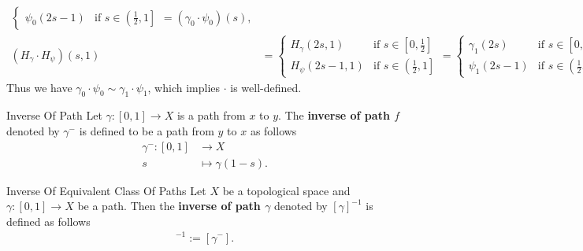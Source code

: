 \documentclass{report}
\begin{document}
\begin{prf}
\[\begin{aligned}
\begin{cases}
				                                                           \psi_0(2s-1) & \text{if }s\in\left(\left.\frac{1}{2},1\right]\right.
			                                                           \end{cases}=\left(\gamma_0\cdot \psi_0\right)(s), \\
			\left(H_{\gamma}\cdot H_{\psi}\right)(s, 1) & =\begin{cases}
				                                               H_{\gamma}(2s, 1) & \text{if }s\in\left[0,\frac{1}{2}\right]              \\
				                                               H_{\psi}(2s-1, 1) & \text{if }s\in\left(\left.\frac{1}{2},1\right]\right.
			                                               \end{cases}=\begin{cases}
				                                                           \gamma_1(2s) & \text{if }s\in\left[0,\frac{1}{2}\right]              \\
				                                                           \psi_1(2s-1) & \text{if }s\in\left(\left.\frac{1}{2},1\right]\right.
			                                                           \end{cases}=\left(\gamma_1\cdot \psi_1\right)(s).
		\end{aligned}\]
	Thus we have $\gamma_0\cdot \psi_0\sim \gamma_1\cdot \psi_1$, which implies $\cdot$ is well-defined.
\end{prf}

\begin{definition}{Inverse Of Path}{}
	Let $\gamma: [0,1] \longrightarrow X$ is a path from $x$ to $y$. The \textbf{inverse of path $f$} denoted by $\gamma^{-}$ is defined to be a path from $y$ to $x$ as follows
	\begin{align*}
		\gamma^{-}:[0,1] & \longrightarrow X        \\
		s                & \longmapsto \gamma(1-s).
	\end{align*}
\end{definition}

\begin{definition}{Inverse Of Equivalent Class Of Paths}{}
	Let $X$ be a topological space and $\gamma:[0,1]\to X$ be a path. Then the \textbf{inverse of path $\gamma$} denoted by $[\gamma]^{-1}$ is defined as follows
	\begin{align*}
		[\gamma]^{-1}:=[\gamma^{-}].
	\end{align*}
\end{definition}
\end{document}

